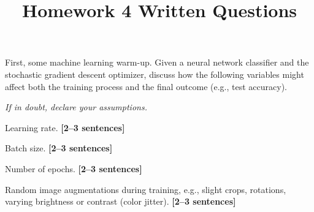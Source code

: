 \documentclass{csci1430}
\begin{document}
\title{Homework 4 Written Questions}
\maketitle

\writeinstructions

\pagebreak
\begin{question}[points=8,drawbox=false]
First, some machine learning warm-up. Given a neural network classifier and the stochastic gradient descent optimizer, discuss how the following variables might affect both the training process and the final outcome (e.g., test accuracy).

\emph{If in doubt, declare your assumptions.}
\end{question}

\begin{subquestion}[points=2]
Learning rate. \textbf{[2--3 sentences]}
\end{subquestion}

\begin{answer}[height=12]

\end{answer}


\begin{subquestion}[points=2]
Batch size. \textbf{[2--3 sentences]}
\end{subquestion}

\begin{answer}[height=12]

\end{answer}


\pagebreak
\begin{subquestion}[points=2]
Number of epochs. \textbf{[2--3 sentences]}
\end{subquestion}

\begin{answer}[height=12]

\end{answer}


\begin{subquestion}[points=2]
Random image augmentations during training, e.g., slight crops, rotations, varying brightness or contrast (color jitter). \textbf{[2--3 sentences]}
\end{subquestion}

\begin{answer}[height=12]

\end{answer}
\end{document}
